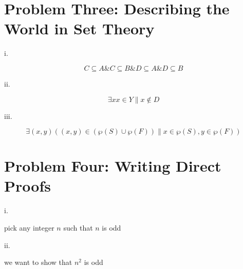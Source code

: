 \documentclass{article}
\renewcommand{\(}{\left(}
\renewcommand{\)}{\right)}
\theoremstyle{plain}
\theoremstyle{plain}
\theoremstyle{definition}
\begin{document}
\newpage

\section*{Problem Three: Describing the World in Set Theory}

i.
\begin{shaded}
$$C \subseteq A\& C \subseteq B \& D \subseteq A \& D \subseteq B$$
\end{shaded}

ii.
\begin{shaded}
$$\exists x x \in Y \| x \notin D$$
\end{shaded}

iii.
\begin{shaded}
$$\exists (x,y) ((x,y) \in (\wp(S) \cup \wp(F)) \| x \in \wp(S), y \in \wp(F))$$
\end{shaded}

\newpage

\section*{Problem Four: Writing Direct Proofs}
i.
\begin{shaded}
pick any integer $n$ such that $n$ is odd
\end{shaded}

ii.
\begin{shaded}
we want to show that $n^2$ is odd
\end{shaded}
\end{document}
